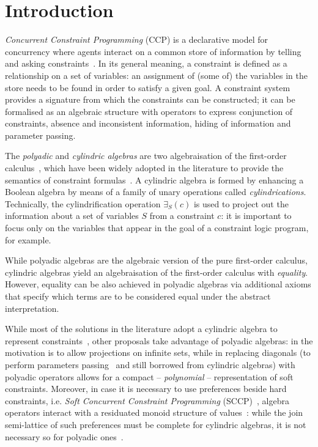 \documentclass{llncs}
\begin{document}

\section{Introduction}\label{sec:intro}
\emph{Concurrent Constraint Programming} (CCP) is a declarative model for concurrency where agents interact on a common store of information by telling and asking constraints~\cite{emerging}.  In its general meaning, a constraint is defined as a relationship on a set of variables: an assignment of (some of) the variables in the store needs to be found in order to satisfy a given goal.  A constraint system provides a signature from which the constraints can be constructed;  it can be formalised as an algebraic structure with operators to express conjunction of constraints, absence and inconsistent information, hiding of information and parameter passing.


The \emph{polyadic}  and  \emph{cylindric algebras} are two algebraisation of  the first-order calculus~\cite{cylalgebraic}, which have been widely  adopted in the literature to provide the semantics of constraint formulas~\cite{fgcs92,popl91}. A cylindric algebra is formed by enhancing a Boolean algebra by means of a family of unary operations called \emph{cylindrications}. Technically, the cylindrification operation $\exists_S(c)$ is used to project out the information about a set of variables $S$ from a constraint $c$: it is important to focus only on  the variables that appear in the goal of a constraint logic program, for example.

While polyadic algebras are the algebraic version of the pure first-order calculus, cylindric algebras yield an algebraisation of the first-order calculus with \emph{equality}. However, equality can be also achieved in polyadic algebras via additional axioms that specify which terms are to be considered equal under the abstract interpretation.

 While most of the solutions in the literature adopt a cylindric algebra to represent constraints~\cite{popl91}, other proposals take advantage of polyadic algebras: in \cite{fgcs92} the motivation is to allow projections on infinite sets, while in  \cite{festcatuscia} replacing diagonals (to perform parameters passing~\cite{popl91} and still borrowed from cylindric algebras) with polyadic operators allows for a compact – \emph{polynomial} – representation of soft constraints.  Moreover, in case it is necessary to use preferences beside hard constraints, i.e. \emph{Soft Concurrent Constraint Programming} (SCCP)~\cite{jacm97,jlamp17}, algebra operators interact with a residuated monoid structure of values~\cite{ipl17}: while the join semi-lattice of such preferences must be complete for cylindric algebras,  it is not necessary so for polyadic ones~\cite{festcatuscia}.
\end{document}
